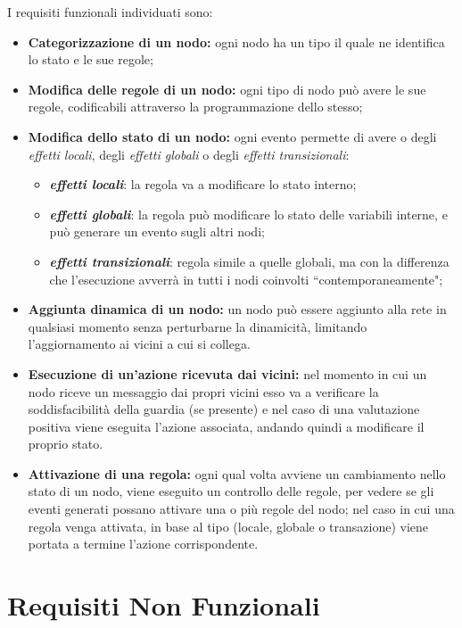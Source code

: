 \documentclass[italian]{memoir}
\begin{document}
I requisiti funzionali individuati sono:
\begin{itemize}
\item \textbf{Categorizzazione di un nodo:} ogni nodo ha un tipo il quale ne identifica
	   lo stato e le sue regole;
\item \textbf{Modifica delle regole di un nodo:} ogni tipo di nodo può avere le
	   sue regole, codificabili attraverso la programmazione dello stesso;
\item \textbf{Modifica dello stato di un nodo:} ogni evento permette di avere o degli
	   \textit{effetti locali}, degli \textit{effetti globali} o degli \textit{effetti transizionali}:
	\begin{itemize}
	\item \textit{\textbf{effetti locali}}: la regola va a modificare lo stato interno;
	\item \textit{\textbf{effetti globali}}: la regola può modificare lo stato delle
	   variabili interne, e può generare un evento sugli altri nodi;
	\item \textit{\textbf{effetti transizionali}}: regola simile a quelle globali, ma con la differenza
	   che l'esecuzione avverrà in tutti i nodi coinvolti ``contemporaneamente";
	\end{itemize}
\item \textbf{Aggiunta dinamica di un nodo:} un nodo può essere aggiunto alla rete
	   in qualsiasi momento senza perturbarne la dinamicità, limitando l'aggiornamento
	   ai vicini a cui si collega.
\item \textbf{Esecuzione di un'azione ricevuta dai vicini:} nel momento in cui un
	   nodo riceve un messaggio dai propri vicini esso va a verificare la soddisfacibilità
	   della guardia (se presente) e nel caso di una valutazione positiva viene eseguita
	   l'azione associata, andando quindi a modificare il proprio stato.
\item \textbf{Attivazione di una regola:} ogni qual volta avviene un cambiamento
	   nello stato di un nodo, viene eseguito un controllo delle regole, per vedere
	   se gli
	   eventi generati possano attivare una o più regole del nodo; nel caso in cui
	   una regola venga attivata, in base al tipo (locale, globale o transazione) viene portata a termine
	   l'azione corrispondente.
\end{itemize}

\section{Requisiti Non Funzionali}
\end{document}
